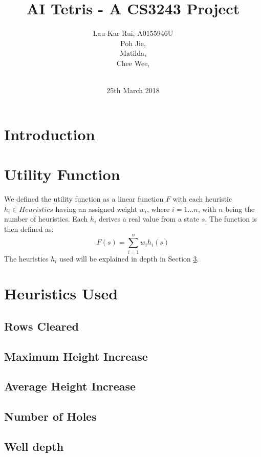 \documentclass[12pt]{article}
\title{AI Tetris - A CS3243 Project}
\author
{Lau Kar Rui, A0155946U\\
Poh Jie, \\
Matilda, \\
Chee Wee, \\
\\
}
\date{25th March 2018}
\begin{document}
 


\baselineskip20pt


\maketitle 


\section{Introduction}
	
	
\section{Utility Function}
We defined the utility function as a linear function $F$ with each heuristic $h_i \in Heuristics$ having an assigned weight $w_i$, where $i = 1...n$, with $n$ being the number of heuristics. Each $h_i$ derives a real value from a state $s$. The function is then defined as:
	$$F(s) = \sum_{i = 1}^{n} w_ih_i(s)$$
The heuristics $h_i$ used will be explained in depth in Section \ref{heuristics}.
	
\section{Heuristics Used} \label{heuristics}

\subsection{Rows Cleared}

\subsection{Maximum Height Increase}

\subsection{Average Height Increase}

\subsection{Number of Holes}

\subsection{Well depth}
\end{document}
